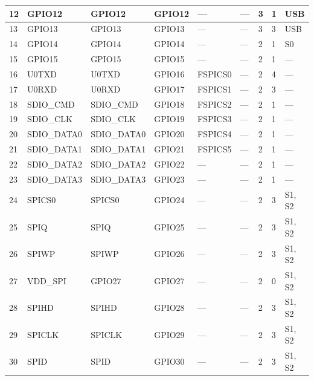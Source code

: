\begin{longtable}[c]{|p{0.7cm}|p{1.9cm}|p{1.9cm}|p{1.6cm}|p{1.6cm}|p{1.6cm}|p{1cm}|p{1cm}|p{1.2cm}| }
12 & GPIO12          & GPIO12        & GPIO12  & ---          & ---            & 3           & 1 & USB \\ \hline
13 & GPIO13          & GPIO13        & GPIO13  & ---          & ---            & 3           & 3 & USB \\ \hline
14 & GPIO14          & GPIO14        & GPIO14  & ---          & ---            & 2           & 1 & S0 \\ \hline
15 & GPIO15          & GPIO15        & GPIO15  & ---          & ---            & 2           & 1 & --- \\ \hline
16 & U0TXD           & U0TXD         & GPIO16  & FSPICS0    & ---            & 2           & 4 & --- \\ \hline
17 & U0RXD           & U0RXD         & GPIO17  & FSPICS1    & ---            & 2           & 3 & --- \\ \hline
18 & SDIO\_CMD       & SDIO\_CMD     & GPIO18  & FSPICS2    & ---            & 2           & 1 & --- \\ \hline
19 & SDIO\_CLK       & SDIO\_CLK     & GPIO19  & FSPICS3    & ---            & 2           & 1 & --- \\ \hline
20 & SDIO\_DATA0     & SDIO\_DATA0   & GPIO20  & FSPICS4    & ---            & 2           & 1 & --- \\ \hline
21 & SDIO\_DATA1     & SDIO\_DATA1   & GPIO21  & FSPICS5    & ---            & 2           & 1 & --- \\ \hline
22 & SDIO\_DATA2     & SDIO\_DATA2   & GPIO22  & ---          & ---            & 2           & 1 & --- \\ \hline
23 & SDIO\_DATA3     & SDIO\_DATA3   & GPIO23  & ---          & ---            & 2           & 1 & --- \\ \hline
24 & SPICS0          & SPICS0        & GPIO24  & ---          & ---            & 2           & 3 & S1, S2 \\ \hline
25 & SPIQ            & SPIQ          & GPIO25  & ---          & ---            & 2           & 3 & S1, S2 \\ \hline
26 & SPIWP           & SPIWP         & GPIO26  & ---          & ---            & 2           & 3 & S1, S2 \\ \hline
27 & VDD\_SPI        & GPIO27        & GPIO27  & ---          & ---            & 2           & 0 & S1, S2 \\ \hline
28 & SPIHD           & SPIHD         & GPIO28  & ---          & ---            & 2           & 3 & S1, S2 \\ \hline
29 & SPICLK          & SPICLK        & GPIO29  & ---          & ---            & 2           & 3 & S1, S2 \\ \hline
30 & SPID            & SPID          & GPIO30  & ---          & ---            & 2           & 3 & S1, S2 \\ \hline

    \end{longtable}
\normalsize

